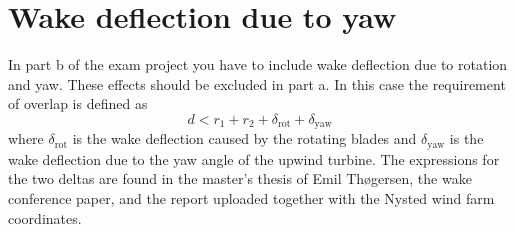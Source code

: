\documentclass[a4paper, 11pt]{article}
\begin{document}
\section{Wake deflection due to yaw}
In part b of the exam project you have to include wake deflection due to rotation and yaw. These effects should be excluded in part a. In this case the requirement of overlap is defined as
\begin{equation}
d < r_1+r_2+\delta_\text{rot}+\delta_\text{yaw}
\end{equation}
where $\delta_\text{rot}$ is the wake deflection caused by the rotating blades and $\delta_\text{yaw}$ is the wake deflection due to the yaw angle of the upwind turbine. The expressions for the two deltas are found in the master's thesis of Emil Thøgersen, the wake conference paper, and the report uploaded together with the Nysted wind farm coordinates. 
\end{document}
